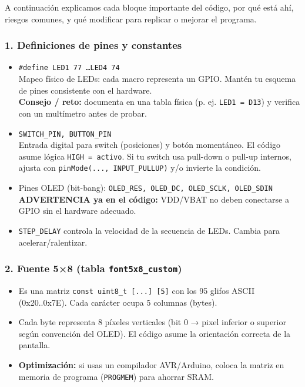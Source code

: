\documentclass[a4paper,12pt]{article}
\begin{document}
A continuación explicamos cada bloque importante del código, por qué está ahí, riesgos comunes, y qué modificar para replicar o mejorar el programa.

\subsubsection*{1. Definiciones de pines y constantes}
\begin{itemize}
  \item \texttt{\#define LED1 77 \dots LED4 74} \\
    Mapeo físico de LEDs: cada macro representa un GPIO. Mantén tu esquema de pines consistente con el hardware. \\
    \textbf{Consejo / reto:} documenta en una tabla física (p. ej. \texttt{LED1 = D13}) y verifica con un multímetro antes de probar.
  \item \texttt{SWITCH\_PIN, BUTTON\_PIN} \\
    Entrada digital para switch (posiciones) y botón momentáneo. El código asume lógica \texttt{HIGH = activo}. Si tu switch usa pull-down o pull-up internos, ajusta con \texttt{pinMode(..., INPUT\_PULLUP)} y/o invierte la condición.
  \item Pines OLED (bit-bang): \texttt{OLED\_RES, OLED\_DC, OLED\_SCLK, OLED\_SDIN} \\
    \textbf{ADVERTENCIA ya en el código:} VDD/VBAT no deben conectarse a GPIO sin el hardware adecuado.
  \item \texttt{STEP\_DELAY} controla la velocidad de la secuencia de LEDs. Cambia para acelerar/ralentizar.
\end{itemize}

\subsubsection*{2. Fuente 5×8 (tabla \texttt{font5x8\_custom})}
\begin{itemize}
  \item Es una matriz \texttt{const uint8\_t [...] [5]} con los 95 glifos ASCII (0x20..0x7E). Cada carácter ocupa 5 columnas (bytes).
  \item Cada byte representa 8 píxeles verticales (bit 0 → pixel inferior o superior según convención del OLED). El código asume la orientaci\'on correcta de la pantalla.
  \item \textbf{Optimización:} si usas un compilador AVR/Arduino, coloca la matriz en memoria de programa (\texttt{PROGMEM}) para ahorrar SRAM.
\end{itemize}
\end{document}
